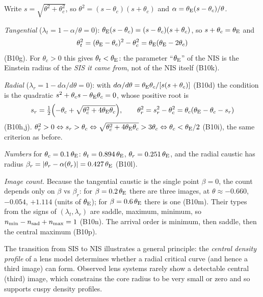 \begin{derivation}
Write $s = \sqrt{\theta^2+\theta_c^2}$, so $\theta^2 = (s-\theta_c)(s+\theta_c)$ and
$\alpha = \theta_{\mathrm{E}}(s-\theta_c)/\theta$.

\emph{Tangential} ($\lambda_t = 1-\alpha/\theta = 0$):
$\theta_{\mathrm{E}}(s-\theta_c) = (s-\theta_c)(s+\theta_c)$, so $s+\theta_c = \theta_{\mathrm{E}}$ and
\[
  \theta_t^2 = (\theta_{\mathrm{E}}-\theta_c)^2-\theta_c^2 = \theta_{\mathrm{E}}(\theta_{\mathrm{E}}-2\theta_c)
\]
(B10g).  For $\theta_c>0$ this gives $\theta_t<\theta_{\mathrm{E}}$: the parameter
``$\theta_{\mathrm{E}}$'' of the NIS is the Einstein radius of the \emph{SIS it came from},
not of the NIS itself (B10k).

\emph{Radial} ($\lambda_r = 1-d\alpha/d\theta = 0$): with
$d\alpha/d\theta = \theta_{\mathrm{E}}\theta_c/[s(s+\theta_c)]$ (B10d) the condition is the
quadratic $s^2+\theta_c s-\theta_{\mathrm{E}}\theta_c = 0$, whose positive root is
\[
  s_r = \tfrac12\Bigl(-\theta_c+\sqrt{\theta_c^2+4\theta_{\mathrm{E}}\theta_c}\Bigr),
  \qquad
  \theta_r^2 = s_r^2-\theta_c^2 = \theta_c(\theta_{\mathrm{E}}-\theta_c-s_r)
\]
(B10h,j).  $\theta_r^2>0\Leftrightarrow s_r>\theta_c\Leftrightarrow
\sqrt{\theta_c^2+4\theta_{\mathrm{E}}\theta_c}>3\theta_c\Leftrightarrow\theta_c<\theta_{\mathrm{E}}/2$ (B10i),
the same criterion as before.

\emph{Numbers} for $\theta_c = 0.1\,\theta_{\mathrm{E}}$: $\theta_t = 0.894\,\theta_{\mathrm{E}}$,
$\theta_r = 0.251\,\theta_{\mathrm{E}}$, and the radial caustic has radius
$\beta_r = |\theta_r-\alpha(\theta_r)| = 0.427\,\theta_{\mathrm{E}}$ (B10l).

\emph{Image count.}  Because the tangential caustic is the single point
$\beta = 0$, the count depends only on $\beta$ vs $\beta_r$: for
$\beta = 0.2\,\theta_{\mathrm{E}}$ there are three images, at
$\theta\approx-0.660$, $-0.054$, $+1.114$ (units of $\theta_{\mathrm{E}}$); for
$\beta = 0.6\,\theta_{\mathrm{E}}$ there is one (B10m).  Their types from the signs of
$(\lambda_t,\lambda_r)$ are saddle, maximum, minimum, so
$n_{\min}-n_{\rm sad}+n_{\max} = 1$ (B10n).  The arrival order is minimum,
then saddle, then the central maximum (B10p).
\end{derivation}

\begin{remark}
The transition from SIS to NIS illustrates a general principle:
the \textit{central density profile} of a lens model determines
whether a radial critical curve (and hence a third image) can form.
Observed lens systems rarely show a detectable central (third)
image, which constrains the core radius to be very small or zero and
so supports cuspy density profiles.
\end{remark}

